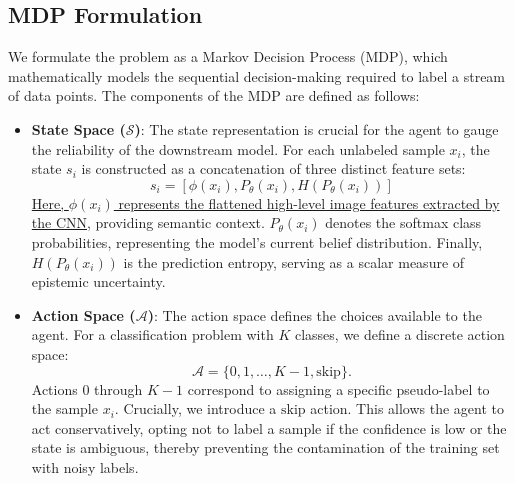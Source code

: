 \documentclass[pdflatex,sn-mathphys-num]{sn-jnl}%
\theoremstyle{thmstyleone}%
\theoremstyle{thmstyletwo}%
\theoremstyle{thmstylethree}%
\begin{document}
\subsection{MDP Formulation}\label{subsec:mdp}

We formulate the problem as a Markov Decision Process (MDP), which mathematically models the sequential decision-making required to label a stream of data points. The components of the MDP are defined as follows:

\begin{itemize}

    \item \textbf{State Space ($\mathcal{S}$)}: The state representation is crucial for the agent to gauge the reliability of the downstream model. For each unlabeled sample $x_i$, the state $s_i$ is constructed as a concatenation of three distinct feature sets:
    \begin{equation}
     s_i = [\phi(x_i), P_\theta(x_i), H(P_\theta(x_i))]
    \end{equation}
    \underline{Here, $\phi(x_i)$ represents the flattened high-level image features extracted by the CNN}, providing semantic context. $P_\theta(x_i)$ denotes the softmax class probabilities, representing the model's current belief distribution. Finally, $H(P_\theta(x_i))$ is the prediction entropy, serving as a scalar measure of epistemic uncertainty.
    
    \item \textbf{Action Space ($\mathcal{A}$)}: The action space defines the choices available to the agent. For a classification problem with $K$ classes, we define a discrete action space:
    \begin{equation}
    \mathcal{A} = \{0, 1, \ldots, K-1, \text{skip}\}.
    \end{equation}
    Actions $0$ through $K-1$ correspond to assigning a specific pseudo-label to the sample $x_i$. Crucially, we introduce a $\text{skip}$ action. This allows the agent to act conservatively, opting not to label a sample if the confidence is low or the state is ambiguous, thereby preventing the contamination of the training set with noisy labels.
    

\end{itemize}
\end{document}
